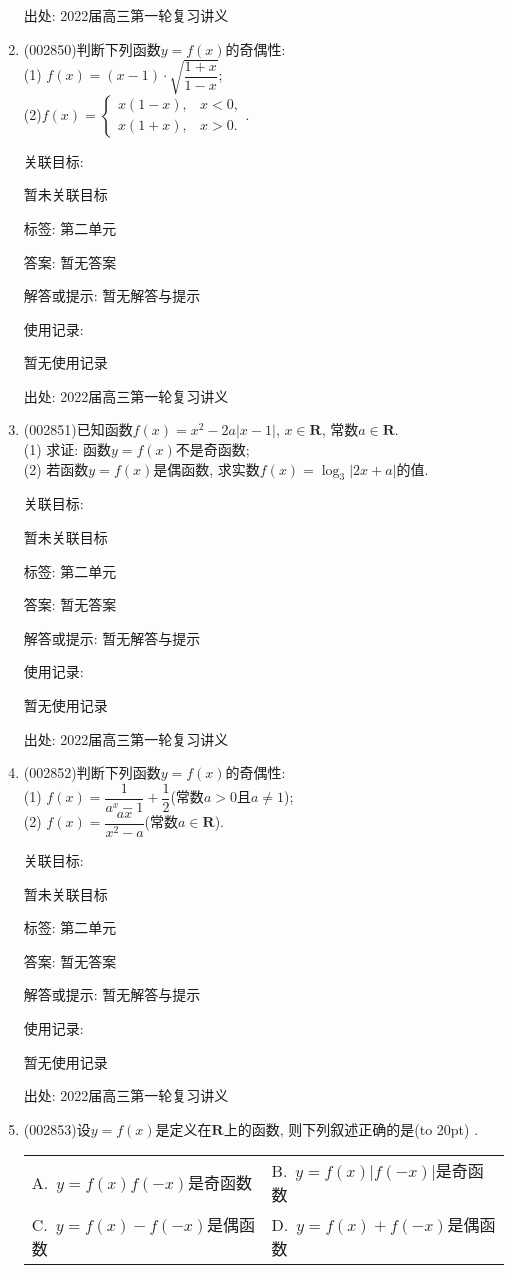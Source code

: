 \documentclass[10pt,a4paper]{article}
\newcommand{\bracket}[1]{(\hbox to #1pt{})}
\newcommand{\twoch}[4]{\par\begin{tabular}{p{.46\textwidth}p{.46\textwidth}}
A.~#1& B.~#2\\
C.~#3& D.~#4
\end{tabular}}
\begin{document}
\begin{enumerate}[1.]
出处: 2022届高三第一轮复习讲义
\item { (002850)}判断下列函数$y=f(x)$的奇偶性:\\
(1) $f(x)=(x-1)\cdot \sqrt{\dfrac{1+x}{1-x}}$;\\
(2)$f(x)=\begin{cases} x(1-x), & x<0, \\ x(1+x),& x>0. \end{cases}$.


关联目标:

暂未关联目标



标签: 第二单元

答案: 暂无答案

解答或提示: 暂无解答与提示

使用记录:

暂无使用记录


出处: 2022届高三第一轮复习讲义
\item { (002851)}已知函数$f(x)=x^2-2a|x-1|$, $x\in \mathbf{R}$, 常数$a\in \mathbf{R}$.\\
(1) 求证: 函数$y=f(x)$不是奇函数;\\
(2) 若函数$y=f(x)$是偶函数, 求实数$f(x)=\log_3| 2x+a |$的值.


关联目标:

暂未关联目标



标签: 第二单元

答案: 暂无答案

解答或提示: 暂无解答与提示

使用记录:

暂无使用记录


出处: 2022届高三第一轮复习讲义
\item { (002852)}判断下列函数$y=f(x)$的奇偶性:\\
(1) $f(x)=\dfrac 1{a^x-1}+\dfrac 12$(常数$a>0$且$a\ne 1$);\\
(2) $f(x)=\dfrac{ax}{x^2-a}$(常数$a\in \mathbf{R}$).


关联目标:

暂未关联目标



标签: 第二单元

答案: 暂无答案

解答或提示: 暂无解答与提示

使用记录:

暂无使用记录


出处: 2022届高三第一轮复习讲义
\item { (002853)}设$y=f(x)$是定义在$\mathbf{R}$上的函数, 则下列叙述正确的是\bracket{20} .
\twoch{$y=f(x)f(-x)$是奇函数}{$y=f(x)|f(-x)|$是奇函数}{$y=f(x)-f(-x)$是偶函数	}{$y=f(x)+f(-x)$是偶函数}



\end{enumerate}
\end{document}
